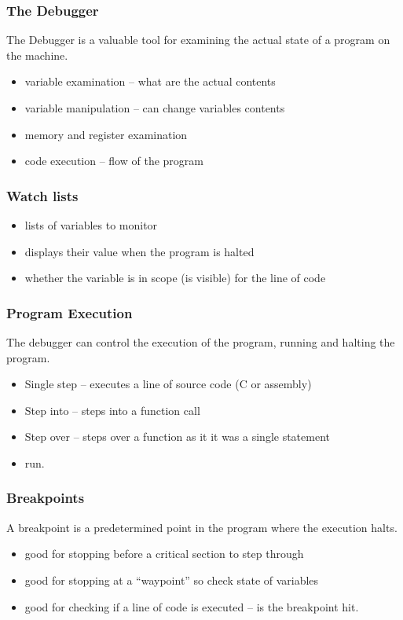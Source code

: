 \documentclass{beamer}
\begin{document}
\begin{frame}
  \frametitle{The Debugger}
  The Debugger is a valuable tool for examining the actual state of a
  program on the machine.
  \begin{itemize}
  \item variable examination -- what are the actual contents
  \item variable manipulation -- can change variables contents
  \item memory and register examination
  \item code execution -- flow of the program
  \end{itemize}
\end{frame}

\begin{frame}
  \frametitle{Watch lists}
  \begin{itemize}
  \item lists of variables to monitor 
  \item displays their value when the program is halted
  \item whether the variable is in scope (is visible) for the line of code
  \end{itemize}
\end{frame}

\begin{frame}
  \frametitle{Program Execution}
  The debugger can control the execution of the program, running and
  halting the program.
  \begin{itemize}
  \item Single step -- executes a line of source code (C or assembly)
  \item Step into -- steps into a function call
  \item Step over -- steps over a function as it it was a single
    statement
  \item run.
  \end{itemize}
\end{frame}
\begin{frame}
  \frametitle{Breakpoints}
  A breakpoint is a predetermined point in the program where the
  execution halts.
  \begin{itemize}
  \item good for stopping before a critical section to step through
  \item good for stopping at a ``waypoint'' so check state of
    variables
  \item good for checking if a line of code is executed -- is the
    breakpoint hit.
  \end{itemize}
\end{frame}
\end{document}
